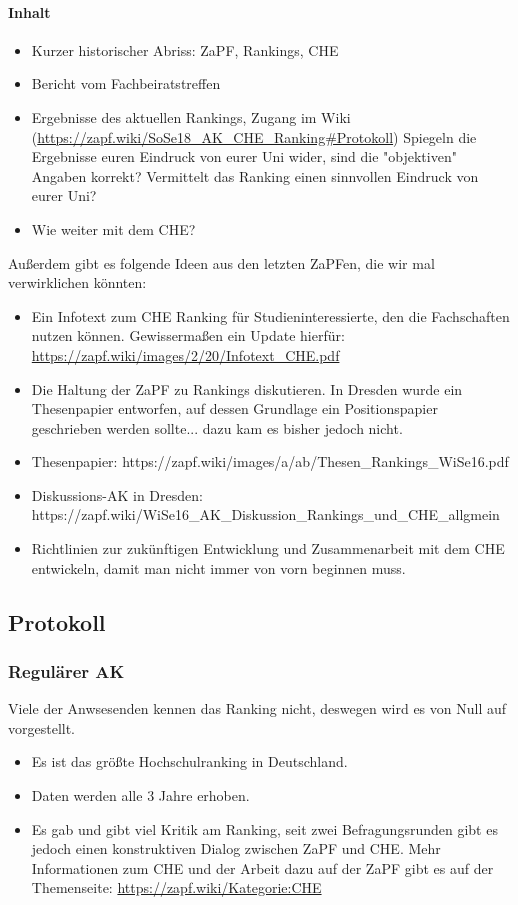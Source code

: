     \paragraph{Inhalt}
      \begin{itemize}
        \item Kurzer historischer Abriss: ZaPF, Rankings, CHE
        \item Bericht vom Fachbeiratstreffen
        \item Ergebnisse des aktuellen Rankings, Zugang im Wiki (\url{https://zapf.wiki/SoSe18_AK_CHE_Ranking#Protokoll})
        Spiegeln die Ergebnisse euren Eindruck von eurer Uni wider, sind die "objektiven" Angaben korrekt?
        Vermittelt das Ranking einen sinnvollen Eindruck von eurer Uni?
        \item Wie weiter mit dem CHE?
      \end{itemize}
      Außerdem gibt es folgende Ideen aus den letzten ZaPFen, die wir mal verwirklichen könnten:
      \begin{itemize}
        \item Ein Infotext zum CHE Ranking für Studieninteressierte, den die Fachschaften nutzen können. Gewissermaßen ein Update hierfür: \url{https://zapf.wiki/images/2/20/Infotext_CHE.pdf}
        \item Die Haltung der ZaPF zu Rankings diskutieren. In Dresden wurde ein Thesenpapier entworfen, auf dessen Grundlage ein Positionspapier geschrieben werden sollte... dazu kam es bisher jedoch nicht.
        \item Thesenpapier: https://zapf.wiki/images/a/ab/Thesen_Rankings_WiSe16.pdf
        \item Diskussions-AK in Dresden: https://zapf.wiki/WiSe16_AK_Diskussion_Rankings_und_CHE_allgmein
        \item Richtlinien zur zukünftigen Entwicklung und Zusammenarbeit mit dem CHE entwickeln, damit man nicht immer von vorn beginnen muss.
      \end{itemize}

  \subsection*{Protokoll}
    \subsubsection{Regulärer AK}
      Viele der Anwsesenden kennen das Ranking nicht, deswegen wird es von Null auf vorgestellt.
        \begin{itemize}
          \item Es ist das größte Hochschulranking in Deutschland.
          \item Daten werden alle 3 Jahre erhoben.
          \item Es gab und gibt viel Kritik am Ranking, seit zwei Befragungsrunden gibt es jedoch einen konstruktiven Dialog zwischen ZaPF und CHE. Mehr Informationen zum CHE und der Arbeit dazu auf der ZaPF gibt es auf der Themenseite: \url{https://zapf.wiki/Kategorie:CHE}
        \end{itemize}


